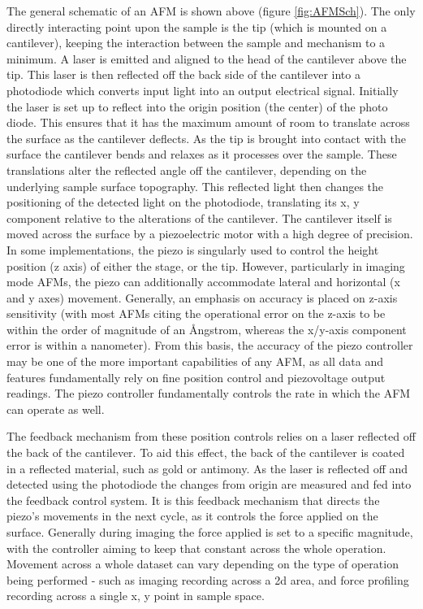 The general schematic of an AFM is shown above (figure \ref{fig:AFMSch}). The only directly interacting point upon the sample is the tip (which is mounted on a cantilever), keeping the interaction between the sample and mechanism to a minimum. A laser is emitted and aligned to the head of the cantilever above the tip. This laser is then reflected off the back side of the cantilever into a photodiode which converts input light into an output electrical signal. Initially the laser is set up to reflect into the origin position (the center) of the photo diode. This ensures that it has the maximum amount of room to translate across the surface as the cantilever deflects. As the tip is brought into contact with the surface the cantilever bends and relaxes as it processes over the sample. These translations alter the reflected angle off the cantilever, depending on the underlying sample surface topography. This reflected light then changes the positioning of the detected light on the photodiode, translating its x, y component relative to the alterations of the cantilever. The cantilever itself is moved across the surface by a piezoelectric motor with a high degree of precision. In some implementations, the piezo is singularly used to control the height position (z axis) of either the stage, or the tip. However, particularly in imaging mode AFMs, the piezo can additionally accommodate lateral and horizontal (x and y axes) movement. Generally, an emphasis on accuracy is placed on z-axis sensitivity (with most AFMs citing the operational error on the z-axis to be within the order of magnitude of an \AA{}ngstrom, whereas the x/y-axis component error is within a nanometer). From this basis, the accuracy of the piezo controller may be one of the more important capabilities of any AFM, as all data and features fundamentally rely on fine position control and piezovoltage output readings. The piezo controller fundamentally controls the rate in which the AFM can operate as well. 

The feedback mechanism from these position controls relies on a laser reflected off the back of the cantilever. To aid this effect, the back of the cantilever is coated in a reflected material, such as gold or antimony. As the laser is reflected off and detected using the photodiode the changes from origin are measured and fed into the feedback control system. It is this feedback mechanism that directs the piezo's movements in the next cycle, as it controls the force applied on the surface. Generally during imaging the force applied is set to a specific magnitude, with the controller aiming to keep that constant across the whole operation. Movement across a whole dataset can vary depending on the type of operation being performed - such as imaging recording across a 2d area, and force profiling recording across a single x, y point in sample space.

